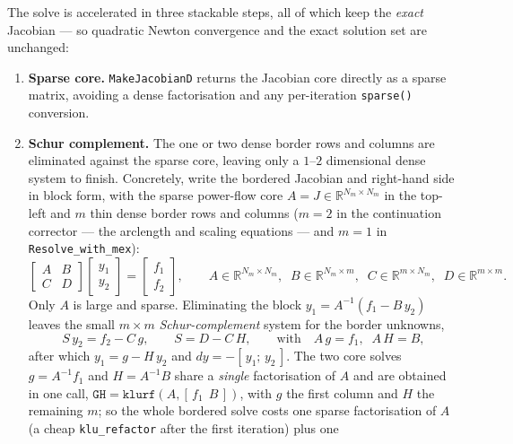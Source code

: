 \documentclass[11pt,a4paper]{article}
\newcommand{\code}[1]{\texttt{#1}}
\begin{document}
The solve is accelerated in three stackable steps, all of which keep the \emph{exact}
Jacobian --- so quadratic Newton convergence and the exact solution set are unchanged:
\begin{enumerate}[leftmargin=1.6em]
  \item \textbf{Sparse core.} \code{MakeJacobianD} returns the Jacobian core directly as a
        sparse matrix, avoiding a dense factorisation and any per-iteration \code{sparse()}
        conversion.
  \item \textbf{Schur complement.} The one or two dense border rows and columns are
        eliminated against the sparse core, leaving only a $1$--$2$ dimensional dense
        system to finish. Concretely, write the bordered Jacobian and right-hand side in
        block form, with the sparse power-flow core $A=J\in\mathbb{R}^{N_m\times N_m}$ in the
        top-left and $m$ thin dense border rows and columns ($m=2$ in the continuation
        corrector --- the arclength and scaling equations --- and $m=1$ in
        \code{Resolve_with_mex}):
        \[
          \begin{bmatrix} A & B\\[2pt] C & D \end{bmatrix}
          \begin{bmatrix} y_1\\[2pt] y_2 \end{bmatrix}
          =
          \begin{bmatrix} f_1\\[2pt] f_2 \end{bmatrix},
          \qquad
          A\in\mathbb{R}^{N_m\times N_m},\;\;
          B\in\mathbb{R}^{N_m\times m},\;\;
          C\in\mathbb{R}^{m\times N_m},\;\;
          D\in\mathbb{R}^{m\times m}.
        \]
        Only $A$ is large and sparse. Eliminating the block $y_1=A^{-1}(f_1-B\,y_2)$ leaves
        the small $m\times m$ \emph{Schur-complement} system for the border unknowns,
        \[
          S\,y_2 = f_2 - C\,g,
          \qquad
          S = D - C\,H,
          \qquad\text{with}\quad
          A\,g = f_1,\;\; A\,H = B,
        \]
        after which $y_1 = g - H\,y_2$ and $dy=-[\,y_1;\,y_2\,]$. The two core solves
        $g=A^{-1}f_1$ and $H=A^{-1}B$ share a \emph{single} factorisation of $A$ and are
        obtained in one call, $\code{GH}=\code{klurf}(A,[\,f_1\ \ B\,])$, with $g$ the first
        column and $H$ the remaining $m$; so the whole bordered solve costs one sparse
        factorisation of $A$ (a cheap \code{klu_refactor} after the first iteration) plus one

\end{enumerate}
\end{document}
